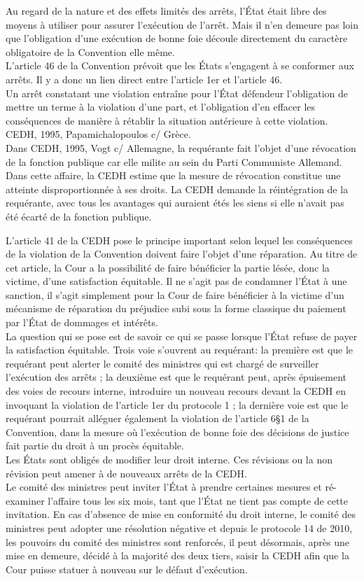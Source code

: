\documentclass[10pt, a4paper, openany]{book}
\begin{document}
Au regard de la nature et des effets limités des arrêts, l'État était libre des moyens à utiliser pour assurer l'exécution de l'arrêt. Mais il n'en demeure pas loin que l'obligation d'une exécution de bonne foie découle directement du caractère obligatoire de la Convention elle même. \\
L'article 46 de la Convention prévoit que les États s'engagent à se conformer aux arrêts. Il y a donc un lien direct entre l'article 1er et l'article 46. \\
Un arrêt constatant une violation entraîne pour l'État défendeur l'obligation de mettre un terme à la violation d'une part, et l'obligation d'en effacer les conséquences de manière à rétablir la situation antérieure à cette violation. CEDH, 1995, Papamichalopoulos c/ Grèce. \\
Dans CEDH, 1995, Vogt c/ Allemagne, la requérante fait l'objet d'une révocation de la fonction publique car elle milite au sein du Parti Communiste Allemand. Dans cette affaire, la CEDH estime que la mesure de révocation constitue une atteinte disproportionnée à ses droits. La CEDH demande la réintégration de la requérante, avec tous les avantages qui auraient étés les siens si elle n'avait pas été écarté de la fonction publique. 


L'article 41 de la CEDH pose le principe important selon lequel les conséquences de la violation de la Convention doivent faire l'objet d'une réparation. Au titre de cet article, la Cour a la possibilité de faire bénéficier la partie lésée, donc la victime, d'une satisfaction équitable. Il ne s'agit pas de condamner l'État à une sanction, il s'agit simplement pour la Cour de faire bénéficier à la victime d'un mécanisme de réparation du préjudice subi sous la forme classique du paiement par l'État de dommages et intérêts. \\
La question qui se pose est de savoir ce qui se passe lorsque l'État refuse de payer la satisfaction équitable. Trois voie s'ouvrent au requérant: la première est que le requérant peut alerter le comité des ministres qui est chargé de surveiller l'exécution des arrêts ; la deuxième est que le requérant peut, après épuisement des voies  de recours interne, introduire un nouveau recours devant la CEDH en invoquant la violation de l'article 1er du protocole 1 ; la dernière voie est que le requérant pourrait alléguer également la violation de l'article 6§1 de la Convention, dans la mesure où l'exécution de bonne foie des décisions de justice fait partie du droit à un procès équitable. \\
Les États sont obligés de modifier leur droit interne. Ces révisions ou la non révision peut amener à de nouveaux arrêts de la CEDH. \\
Le comité des ministres peut inviter l'État à prendre certaines mesures et ré-examiner l'affaire tous les six mois, tant que l'État ne tient pas compte de cette invitation. En cas d'absence de mise en conformité du droit interne, le comité des ministres peut adopter une résolution négative et depuis le protocole 14 de 2010, les pouvoirs du comité des ministres sont renforcés, il peut désormais, après une mise en demeure, décidé à la majorité des deux tiers, saisir la CEDH afin que la Cour puisse statuer à nouveau sur le défaut d'exécution. 
\end{document}
